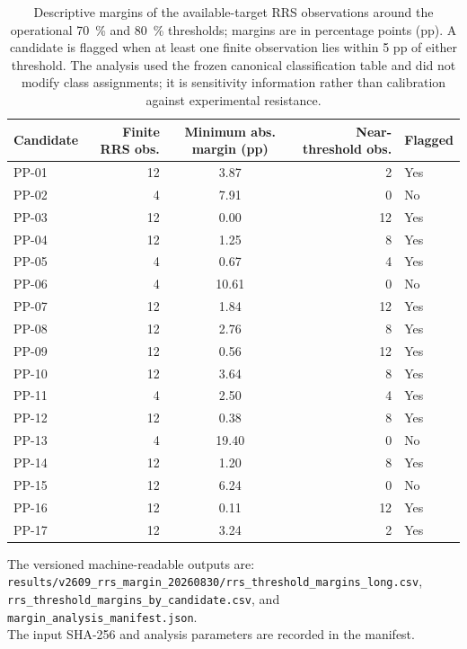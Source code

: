 \begin{table}[htbp]
\centering
\scriptsize
\caption{Descriptive margins of the available-target RRS observations around the operational \qty{70}{\percent} and \qty{80}{\percent} thresholds; margins are in percentage points (pp). A candidate is flagged when at least one finite observation lies within 5 pp of either threshold. The analysis used the frozen canonical classification table and did not modify class assignments; it is sensitivity information rather than calibration against experimental resistance.}
\label{tab:s18_rrs_margin_sensitivity}
\begin{tabularx}{\textwidth}{l r S[table-format=2.2] r l}
\toprule
Candidate & {Finite RRS obs.} & {Minimum abs. margin (pp)} & {Near-threshold obs.} & {Flagged} \\
\midrule
PP-01 & 12 & 3.87 & 2 & Yes \\
PP-02 & 4 & 7.91 & 0 & No \\
PP-03 & 12 & 0.00 & 12 & Yes \\
PP-04 & 12 & 1.25 & 8 & Yes \\
PP-05 & 4 & 0.67 & 4 & Yes \\
PP-06 & 4 & 10.61 & 0 & No \\
PP-07 & 12 & 1.84 & 12 & Yes \\
PP-08 & 12 & 2.76 & 8 & Yes \\
PP-09 & 12 & 0.56 & 12 & Yes \\
PP-10 & 12 & 3.64 & 8 & Yes \\
PP-11 & 4 & 2.50 & 4 & Yes \\
PP-12 & 12 & 0.38 & 8 & Yes \\
PP-13 & 4 & 19.40 & 0 & No \\
PP-14 & 12 & 1.20 & 8 & Yes \\
PP-15 & 12 & 6.24 & 0 & No \\
PP-16 & 12 & 0.11 & 12 & Yes \\
PP-17 & 12 & 3.24 & 2 & Yes \\
\bottomrule
\end{tabularx}
\end{table}

\noindent The versioned machine-readable outputs are:\\ 
\quad\texttt{results/v2609\_rrs\_margin\_20260830/rrs\_threshold\_margins\_long.csv},\\ 
\quad\texttt{rrs\_threshold\_margins\_by\_candidate.csv}, and\\ 
\quad\texttt{margin\_analysis\_manifest.json}.\\ 
The input SHA-256 and analysis parameters are recorded in the manifest.
